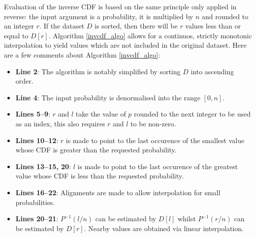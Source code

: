 \documentclass[10pt,final]{siamltex}
\begin{document}
Evaluation of the inverse CDF is based on the same principle only applied in reverse: the input argument is a probability, it is multiplied by $n$ and rounded to an integer $r$. If the dataset $D$ is sorted, then there will be $r$ values less than or equal to $D[r]$. Algorithm \ref{invcdf_algo} allows for a continuos, strictly monotonic interpolation to yield values which are not included in the original dataset.
Here are a few comments about Algorithm \ref{invcdf_algo}:
\begin{itemize}
  \item \textbf{Line 2}: The algorithm is notably simplified by sorting $D$ into ascending order.
  \item \textbf{Line 4}: The input probability is denormalised into the range $[0, n]$.
  \item \textbf{Lines 5--9}: $r$ and $l$ take the value of $p$ rounded to the next integer to be used as an index, this also requires $r$ and $l$ to be non-zero.
  \item \textbf{Lines 10--12}: $r$ is made to point to the last occurence of the smallest value whose CDF is greater than the requested probability.
  \item \textbf{Lines 13--15, 20}: $l$ is made to point to the last occurence of the greatest value whose CDF is less than the requested probability.
  \item \textbf{Lines 16--22}: Alignments are made to allow interpolation for small probabilities.
  \item \textbf{Lines 20--21}: $P^{-1}(l/n)$ can be estimated by $D[l]$ whilst $P^{-1}(r/n)$ can be estimated by $D[r]$. Nearby values are obtained via linear interpolation.
\end{itemize}
%
\end{document}
